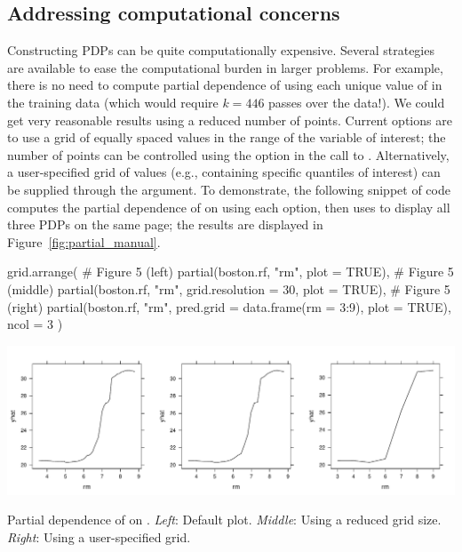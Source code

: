 \subsection{Addressing computational concerns}
\label{sec:computational}

Constructing PDPs can be quite computationally expensive. Several strategies are available to ease the computational burden in larger problems. For example, there is no need to compute partial dependence of  using each unique value of  in the training data (which would require $k = 446$ passes over the data!). We could get very reasonable results using a reduced number of points. Current options are to use a grid of equally spaced values in the range of the variable of interest; the number of points can be controlled using the  option in the call to . Alternatively, a user-specified grid of values (e.g., containing specific quantiles of interest) can be supplied through the  argument. To demonstrate, the following snippet of code computes the partial dependence of  on  using each option, then uses  to display all three PDPs on the same page; the results are displayed in Figure~\ref{fig:partial_manual}.
\begin{example}
grid.arrange(
  # Figure 5 (left)
  partial(boston.rf, "rm", plot = TRUE),
  # Figure 5 (middle)
  partial(boston.rf, "rm", grid.resolution = 30, plot = TRUE),
  # Figure 5 (right)
  partial(boston.rf, "rm", pred.grid = data.frame(rm = 3:9), plot = TRUE),
  ncol = 3
)
\end{example}

\begin{widefigure}[htbp]
  \centering
  \includegraphics[width=0.8\linewidth]{partial_manual}
  \caption{Partial dependence of  on . \textit{Left}: Default plot. \textit{Middle}: Using a reduced grid size. \textit{Right}: Using a user-specified grid.}
  \label{fig:partial_manual}
\end{widefigure}

